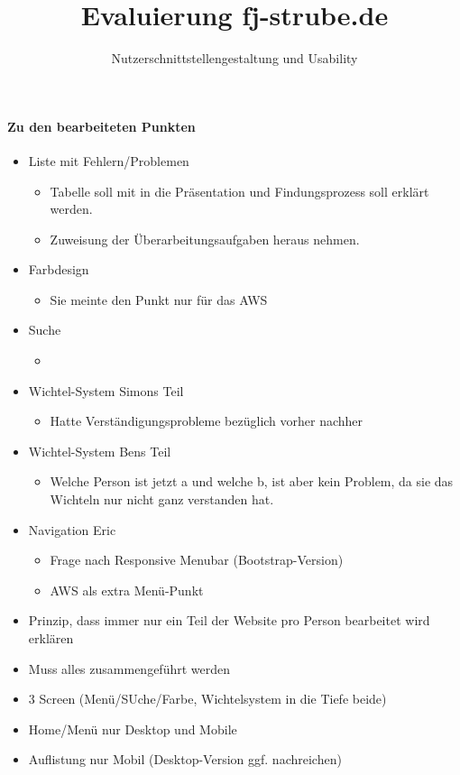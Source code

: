 \documentclass{scrartcl}
\title{Evaluierung fj-strube.de}
\subtitle{Nutzerschnittstellen\-gestaltung und Usability}
\author{Jan Brose\texorpdfstring{\strut\\}{, }
Simon Retsch\texorpdfstring{\strut\\}{, }
Eric Schmidtgen\texorpdfstring{\strut\\}{, }
Ben Schönherr\texorpdfstring{\strut\\}{, }
Falk-Jonatan Strube}
\begin{document}
	\paragraph{Zu den bearbeiteten Punkten}
	\begin{itemize}
		\item Liste mit Fehlern/Problemen
			\begin{itemize}
				\item Tabelle soll mit in die Präsentation und Findungsprozess soll erklärt werden.
				\item Zuweisung der Überarbeitungsaufgaben heraus nehmen.
			\end{itemize}
		\item Farbdesign
			\begin{itemize}
				\item Sie meinte den Punkt nur für das AWS
			\end{itemize}
		\item Suche
			\begin{itemize}
				\item 
			\end{itemize}
		\item Wichtel-System Simons Teil
			\begin{itemize}
				\item Hatte Verständigungsprobleme bezüglich vorher nachher
			\end{itemize}
		\item Wichtel-System Bens Teil
			\begin{itemize}
				\item Welche Person ist jetzt a und welche b, ist aber kein Problem, da sie das Wichteln nur nicht ganz verstanden hat.
			\end{itemize}
		\item Navigation Eric
			\begin{itemize}
				\item Frage nach Responsive Menubar (Bootstrap-Version)
				\item AWS als extra Menü-Punkt

			\end{itemize}
		\item Prinzip, dass immer nur ein Teil der Website pro Person bearbeitet wird erklären
		\item Muss alles zusammengeführt werden
		\item 3 Screen (Menü/SUche/Farbe, Wichtelsystem in die Tiefe beide)
		\item Home/Menü nur Desktop und Mobile
		\item Auflistung nur Mobil (Desktop-Version ggf. nachreichen)		
	\end{itemize}
\end{document}
